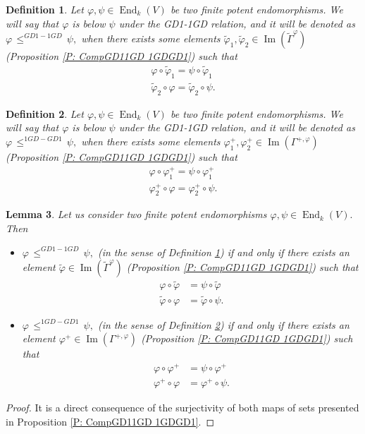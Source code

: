 \documentclass[10pt,a4paper]{amsart}
\newtheorem{defn}{Definition}
\newtheorem{lem}[defn]{Lemma}
\theoremstyle{plain}
\theoremstyle{remark}
\numberwithin{equation}{section} \numberwithin{defn}{section}
\newcommand\ed{\operatorname{End}}
\newcommand{\Img}{\operatorname{Im}}
\newcommand{\f}{\varphi}
\newcommand{\g}{\psi}
\begin{document}
\begin{defn}\label{D: GD11GD bin rel}
Let $\f, \g \in \ed_k(V)$ be two finite potent endomorphisms. We will say that $\f$ is below $\g$ under the GD1-1GD relation, and it will be denoted as $\f \, \leq^{GD1-1GD} \, \g ,$ when there exists some elements $\tilde{\f}_1 , \tilde{\f}_2 \in \Img(\tilde{\Gamma}^{\f})$ (Proposition \ref{P: CompGD11GD 1GDGD1}) such that \begin{align*}
\f\circ \tilde{\f}_1=\g\circ \tilde{\f}_1 \\
\tilde{\f}_2 \circ \f=\tilde{\f}_2 \circ \g.
\end{align*} 
\end{defn}

\begin{defn}\label{D: 1GDGD1 bin rel}
Let $\f, \g \in \ed_k(V)$ be two finite potent endomorphisms. We will say that $\f$ is below $\g$ under the GD1-1GD relation, and it will be denoted as $\f \, \leq^{1GD-GD1} \, \g ,$ when there exists some elements $\f^{+}_1,\f^{+}_2 \in \Img(\Gamma^{+,\f})$ (Proposition \ref{P: CompGD11GD 1GDGD1}) such that \begin{align*}
\f\circ \f^{+}_1=\g\circ \f^{+}_1 \\
\f^{+}_2 \circ \f=\f^{+}_2 \circ \g.
\end{align*} 
\end{defn}

\begin{lem}\label{L: GD11GD et al son G-Based}
Let us consider two finite potent endomorphisms $\f,\g \in \ed_k(V).$ Then \begin{itemize}
\item $\f \, \leq^{GD1-1GD} \, \g ,$ (in the sense of Definition \ref{D: GD11GD bin rel}) if and only if there exists an element $\tilde{\f}\in \Img(\tilde{\Gamma}^{\f})$ (Proposition \ref{P: CompGD11GD 1GDGD1}) such that 
\begin{align*}
\f\circ \tilde{\f}& =\g\circ \tilde{\f}\\
\tilde{\f} \circ \f & =\tilde{\f} \circ \g .
\end{align*}
\item $\f \, \leq^{1GD-GD1} \, \g ,$ (in the sense of Definition \ref{D: 1GDGD1 bin rel}) if and only if there exists an element $\f^+\in \Img(\Gamma^{+,\f})$ (Proposition \ref{P: CompGD11GD 1GDGD1}) such that \begin{align*}
\f\circ \f^{+} & =\g\circ \f^{+} \\
\f^{+} \circ \f & =\f^{+} \circ \g .
\end{align*} 

\end{itemize}
\end{lem}
\begin{proof}
It is a direct consequence of the surjectivity of both maps of sets presented in Proposition \ref{P: CompGD11GD 1GDGD1}.
\end{proof}
\end{document}
